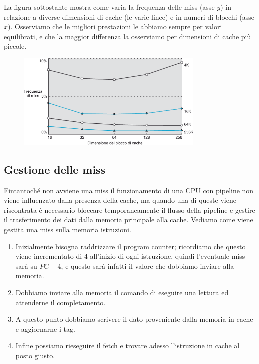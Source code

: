 \documentclass[class=book, crop=false, oneside]{standalone}
\begin{document}
La figura sottostante mostra come varia la frequenza delle miss (asse \(y\)) in relazione a diverse dimensioni di cache (le varie linee) e in numeri di blocchi (asse \(x\)). Osserviamo che le migliori prestazioni le abbiamo sempre per valori equilibrati, e che la maggior differenza la osserviamo per dimensioni di cache più piccole.
\begin{figure}[H]
	\centering
	\includegraphics[width=0.8\textwidth,keepaspectratio]{missfreq.png}
\end{figure}

\subsection{Gestione delle miss}
Fintantoché non avviene una miss il funzionamento di una CPU con pipeline non viene influenzato dalla presenza della cache, ma quando una di queste viene riscontrata è necessario bloccare temporaneamente il flusso della pipeline e gestire il trasferimento dei dati dalla memoria principale alla cache. Vediamo come viene gestita una miss sulla memoria istruzioni.
\begin{enumerate}
	\item Inizialmente bisogna raddrizzare il program counter; ricordiamo che questo viene incrementato di \(4\) all'inizio di ogni istruzione, quindi l'eventuale miss sarà su \(PC-4\), e questo sarà infatti il valore che dobbiamo inviare alla memoria.
	\item Dobbiamo inviare alla memoria il comando di eseguire una lettura ed attenderne il completamento.
	\item A questo punto dobbiamo scrivere il dato proveniente dalla memoria in cache e aggiornarne i tag.
	\item Infine possiamo rieseguire il fetch e trovare adesso l'istruzione in cache al posto giusto.
\end{enumerate}
\end{document}

